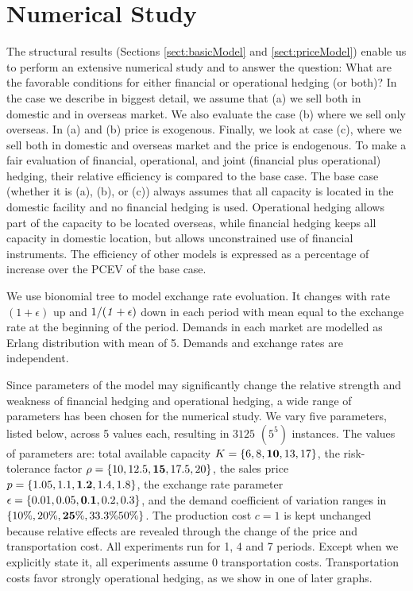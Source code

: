 \documentclass[mnsc,nonblindrev,copyedit]{informs2_wz} %
\begin{document}
\section{Numerical Study \label{sect:numer}}

The structural results (Sections \ref{sect:basicModel} and \ref{sect:priceModel}) enable us to perform an extensive numerical study and to answer the question: What are the favorable conditions for either financial or operational hedging (or both)?  In the case we describe in biggest detail, we assume that (a) we sell both in domestic and in overseas market.  We also evaluate the case (b) where we sell only overseas.  In (a) and (b) price is exogenous.  Finally, we look at case (c), where we sell both in domestic and overseas market and the price is endogenous.  To make a fair evaluation of financial, operational, and joint (financial plus operational) hedging, their relative efficiency is compared to the base case.  The base case (whether it is (a), (b), or (c)) always assumes that all capacity is located in the domestic facility and no financial hedging is used.  Operational hedging allows part of the capacity to be located overseas, while financial hedging keeps all capacity in domestic location, but allows unconstrained use of financial instruments.  The efficiency of other models is expressed as a percentage of increase over the PCEV of the base case.  

We use bionomial tree to model exchange rate evoluation.  It changes with rate {\it $(1+\epsilon)$} up and $1/{\it (1+\epsilon)}$ down in each period with mean equal to the exchange rate at the beginning of the period.  %
Demands in each market are modelled as Erlang distribution with mean of 5.  Demands and exchange rates are independent. 

Since parameters of the model may significantly change the relative strength and weakness of financial hedging and operational hedging, a wide range of parameters has been chosen for the numerical study. We vary five parameters, listed below, across 5 values each, resulting in $3125$ $(5^5)$ instances.  The values of parameters are: total available capacity $K= \{6, 8, \bold{10}, 13, 17\}$, the risk-tolerance factor $\rho = \{10, 12.5, \bold{15}, 17.5, 20\}$, the sales price $p = \{1.05, 1.1, \bold{1.2}, 1.4, 1.8\}$, the exchange rate parameter $\epsilon=\{0.01, 0.05, \bold{0.1}, 0.2, 0.3 \}$, and the demand coefficient of variation ranges in $\{10\%, 20\%, \bold{25\%},33.3\% 50\%\}$.  The production cost $c=1$ is kept unchanged because relative effects are revealed through the change of the price and transportation cost. All experiments run for 1, 4 and 7 periods.  Except when we explicitly state it, all experiments assume 0 transportation costs.  Transportation costs favor strongly operational hedging, as we show in one of later graphs.
\end{document}
